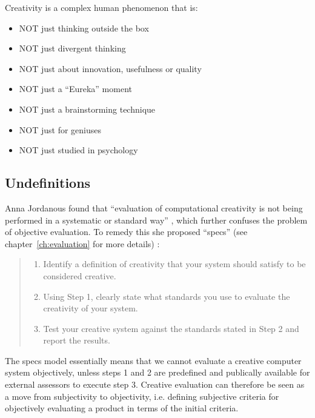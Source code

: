 Creativity is a complex human phenomenon that is:

\begin{itemize}
  \item NOT just thinking outside the box
  \item NOT just divergent thinking
  \item NOT just about innovation, usefulness or quality
  \item NOT just a ``Eureka'' moment
  \item NOT just a brainstorming technique
  \item NOT just for geniuses
  \item NOT just studied in psychology
\end{itemize}




\subsection{Undefinitions}

Anna Jordanous found that ``evaluation of computational creativity is not being performed in a systematic or standard way'' \autocite[p.2]{Jordanous2011}, which further confuses the problem of objective evaluation. To remedy this she proposed ``\gls{specs}'' (see chapter~\ref{ch:evaluation} for more details) \autocite[p.137-140]{Jordanous2012a}:

\begin{quote}
  \begin{enumerate}
    \item Identify a definition of creativity that your system should satisfy to be considered creative.
    \item Using Step 1, clearly state what standards you use to evaluate the creativity of your system.
    \item Test your creative system against the standards stated in Step 2 and report the results.
  \end{enumerate}
\end{quote}

The \gls{specs} model essentially means that we cannot evaluate a creative computer system objectively, unless steps 1 and 2 are predefined and publically available for external assessors to execute step 3. Creative evaluation can therefore be seen as a move from subjectivity to objectivity, i.e. defining subjective criteria for objectively evaluating a product in terms of the initial criteria.

